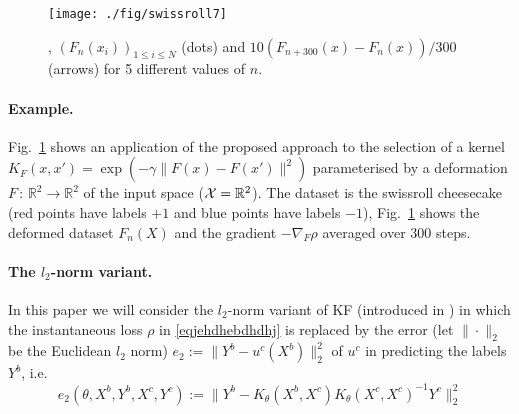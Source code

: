 \documentclass[11pt]{article}
\def\R{\mathbb{R}}
\def\X{{\bf\mathcal{X}}}
\begin{document}
\begin{figure}[h]
\begin{center}
\texttt{[image: ./fig/swissroll7]}
\caption{\cite[Fig.~13]{owhadi2019kernel}, $(F_n(x_i))_{1\leq i \leq N}$ (dots) and $10(F_{n+300}(x)-F_n(x))/300$ (arrows) for 5 different values of $n$.
}
\label{figswissroll7}
\end{center}
\end{figure}

\paragraph{Example.}
Fig.~\ref{figswissroll7} shows an application of the proposed approach to the selection of a kernel
$K_F(x,x')=\exp(-\gamma \|F(x)-F(x')\|^2 )$ parameterised by a deformation $F\,:\,\R^2\rightarrow \R^2$ of the input space ($\X=\R^2$).
The dataset is the swissroll cheesecake (red points have labels $+1$ and blue points have labels $-1$), Fig.~\ref{figswissroll7} shows the deformed dataset $F_n(X)$ and the gradient $-\nabla_F \rho$  averaged over $300$ steps.



\paragraph{The $l_2$-norm variant.}
In this paper we will consider the $l_2$-norm variant of KF (introduced in \cite[Sec.~10]{owhadi2019kernel}) in which the instantaneous loss $\rho$ in \eqref{eqjehdhebdhdhj} is replaced by the error (let $\|\cdot\|_2$ be the Euclidean $l_2$  norm) $e_2:=\|Y^b - u^c(X^b)\|_2^2$ of $u^c$ in predicting the labels $Y^b$, i.e.
\begin{equation}
e_2(\theta,X^b,Y^b,X^c,Y^c):=\|Y^b - K_\theta(X^b,X^c) K_\theta(X^c,X^c)^{-1} Y^c\|_2^2
\end{equation}
\end{document}
